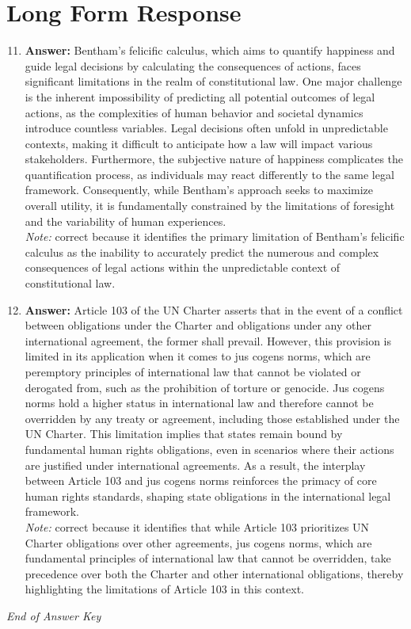 \documentclass[12pt]{article}
\begin{document}
\section*{Long Form Response}
\begin{enumerate}[label=\arabic*.]
\setcounter{enumi}{10}
\item \textbf{Answer:} Bentham's felicific calculus, which aims to quantify happiness and guide legal decisions by calculating the consequences of actions, faces significant limitations in the realm of constitutional law. One major challenge is the inherent impossibility of predicting all potential outcomes of legal actions, as the complexities of human behavior and societal dynamics introduce countless variables. Legal decisions often unfold in unpredictable contexts, making it difficult to anticipate how a law will impact various stakeholders. Furthermore, the subjective nature of happiness complicates the quantification process, as individuals may react differently to the same legal framework. Consequently, while Bentham's approach seeks to maximize overall utility, it is fundamentally constrained by the limitations of foresight and the variability of human experiences.
\\ \textit{Note:} correct because it identifies the primary limitation of Bentham's felicific calculus as the inability to accurately predict the numerous and complex consequences of legal actions within the unpredictable context of constitutional law.
\item \textbf{Answer:} Article 103 of the UN Charter asserts that in the event of a conflict between obligations under the Charter and obligations under any other international agreement, the former shall prevail. However, this provision is limited in its application when it comes to jus cogens norms, which are peremptory principles of international law that cannot be violated or derogated from, such as the prohibition of torture or genocide. Jus cogens norms hold a higher status in international law and therefore cannot be overridden by any treaty or agreement, including those established under the UN Charter. This limitation implies that states remain bound by fundamental human rights obligations, even in scenarios where their actions are justified under international agreements. As a result, the interplay between Article 103 and jus cogens norms reinforces the primacy of core human rights standards, shaping state obligations in the international legal framework.
\\ \textit{Note:} correct because it identifies that while Article 103 prioritizes UN Charter obligations over other agreements, jus cogens norms, which are fundamental principles of international law that cannot be overridden, take precedence over both the Charter and other international obligations, thereby highlighting the limitations of Article 103 in this context.
\end{enumerate}

\vfill
\noindent\textit{End of Answer Key}
\end{document}
